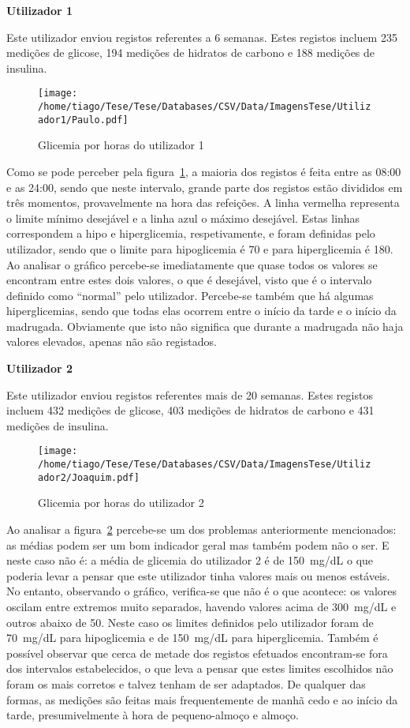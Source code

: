 \textbf{Utilizador 1}

Este utilizador enviou registos referentes a 6 semanas. Estes registos incluem 235 medições de glicose, 194 medições de hidratos de carbono e 188 medições de insulina.

\begin{figure}[H]
\centering
\texttt{[image: /home/tiago/Tese/Tese/Databases/CSV/Data/ImagensTese/Utilizador1/Paulo.pdf]}
\caption{Glicemia por horas do utilizador 1}
\label{fig:uti1}
\end{figure}
Como se pode perceber pela figura~\ref{fig:uti1}, a maioria dos registos é feita entre as 08:00 e as 24:00, sendo que neste intervalo, grande parte dos registos estão divididos em três momentos, provavelmente na hora das refeições. A linha vermelha representa o limite mínimo desejável e a linha azul o máximo desejável. Estas linhas correspondem a hipo e hiperglicemia, respetivamente, e foram definidas pelo utilizador, sendo que o limite para hipoglicemia é 70 e para hiperglicemia é 180. Ao analisar o gráfico percebe-se imediatamente que quase todos os valores se encontram entre estes dois valores, o que é desejável, visto que é o intervalo definido como ``normal'' pelo utilizador. Percebe-se também que há algumas hiperglicemias, sendo que todas elas ocorrem entre o início da tarde e o início da madrugada. Obviamente que isto não significa que durante a madrugada não haja valores elevados, apenas não são registados. 


\textbf{Utilizador 2}

Este utilizador enviou registos referentes mais de 20 semanas. Estes registos incluem 432 medições de glicose, 403 medições de hidratos de carbono e 431 medições de insulina.
\begin{figure}[H]
\centering
\texttt{[image: /home/tiago/Tese/Tese/Databases/CSV/Data/ImagensTese/Utilizador2/Joaquim.pdf]}
\caption{Glicemia por horas do utilizador 2}
\label{fig:uti2}
\end{figure}
Ao analisar a figura~\ref{fig:uti2} percebe-se um dos problemas anteriormente mencionados: as médias podem ser um bom indicador geral mas também podem não o ser. E neste caso não é: a média de glicemia do utilizador 2 é de 150~mg/dL o que poderia levar a pensar que este utilizador tinha valores mais ou menos estáveis. No entanto, observando o gráfico, verifica-se que não é o que acontece: os valores oscilam entre extremos muito separados, havendo valores acima de 300~mg/dL e outros abaixo de 50. Neste caso os limites definidos pelo utilizador foram de 70~mg/dL para hipoglicemia e de 150~mg/dL para hiperglicemia. Também é possível observar que cerca de metade dos registos efetuados encontram-se fora dos intervalos estabelecidos, o que leva a pensar que estes limites escolhidos não foram os mais corretos e talvez tenham de ser adaptados. De qualquer das formas, as medições são feitas mais frequentemente de manhã cedo e ao início da tarde, presumivelmente à hora de pequeno-almoço e almoço. 


